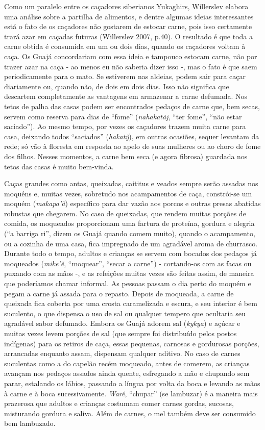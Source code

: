 Como um paralelo entre os caçadores siberianos Yukaghirs, Willerslev
elabora uma análise sobre a partilha de alimentos, e dentre algumas
ideias interessantes está o fato de os caçadores não gostarem de estocar
carne, pois isso certamente trará azar em caçadas futuras (Willerslev
2007, p.40). O resultado é que toda a carne obtida é consumida em um ou
dois dias, quando os caçadores voltam à caça. Os Guajá concordariam com
essa ideia e tampouco estocam carne, não por trazer azar na caça - ao
menos eu não saberia dizer isso -, mas o fato é que saem periodicamente
para o mato. Se estiverem nas aldeias, podem sair para caçar diariamente
ou, quando não, de dois em dois dias. Isso não significa que descartem
completamente as vantagens em armazenar a carne defumada. Nos tetos de
palha das casas podem ser encontrados pedaços de carne que, bem secas,
servem como reserva para dias de ``fome'' (\emph{nahakatãj}, ``ter
fome'', ``não estar saciado''). Ao mesmo tempo, por vezes os caçadores
trazem muita carne para casa, deixando todos ``saciados''
(\emph{hakatỹ}), em outras ocasiões, sequer levantam da rede; só vão à
floresta em resposta ao apelo de suas mulheres ou ao choro de fome dos
filhos. Nesses momentos, a carne bem seca (e agora fibrosa) guardada nos
tetos das casas é muito bem-vinda.

Caças grandes como antas, queixadas, caititus e veados sempre serão
assadas nos moquéns e, muitas vezes, sobretudo nos acampamentos de caça,
constrói-se um moquém (\emph{makapa'ã}) específico para dar vazão aos
porcos e outras presas abatidas robustas que chegarem. No caso de
queixadas, que rendem muitas porções de comida, os moqueados
proporcionam uma fartura de proteína, gordura e alegria (``a barriga
ri'', dizem os Guajá quando comem muito), quando o acampamento, ou a
cozinha de uma casa, fica impregnado de um agradável aroma de churrasco.
Durante todo o tempo, adultos e crianças se servem com bocados dos
pedaços já moqueados (\emph{mike'ẽ}, ``moquear'', ``secar a carne'') -
cortando-os com as facas ou puxando com as mãos -, e as refeições muitas
vezes são feitas assim, de maneira que poderíamos chamar informal. As
pessoas passam o dia perto do moquém e pegam a carne já assada para o
repasto. Depois de moqueada, a carne de queixada fica coberta por uma
crosta caramelizada e escura, e seu interior é bem suculento, o que
dispensa o uso de sal ou qualquer tempero que ocultaria seu agradável
sabor defumado. Embora os Guajá adorem sal (\emph{kykya}) e açúcar e
muitas vezes levem porções de sal (que sempre foi distribuído pelos
postos indígenas) para os retiros de caça, essas pequenas, carnosas e
gordurosas porções, arrancadas enquanto assam, dispensam qualquer
aditivo. No caso de carnes suculentas como a do capelão recém moqueado,
antes de comerem, as crianças avançam nos pedaços assados ainda quente,
esfregando a mão e chupando sem parar, estalando os lábios, passando a
língua por volta da boca e levando as mãos à carne e à boca
sucessivamente. \emph{Warê}, ``chupar'' (se lambuzar) é a maneira mais
prazerosa que adultos e crianças costumam comer carnes gordas, sucosas,
misturando gordura e saliva. Além de carnes, o mel também deve ser
consumido bem lambuzado.

